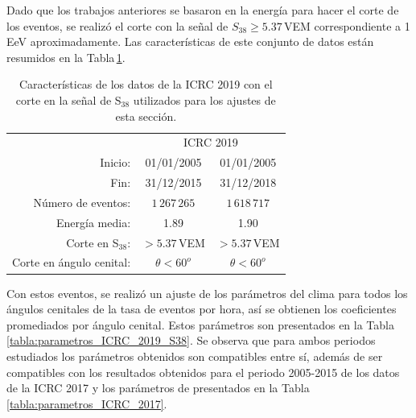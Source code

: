 Dado que los trabajos anteriores se basaron en la energía para hacer el corte de los eventos, se realizó el corte con la señal de $S_{38}\ge 5.37\,$VEM correspondiente a 1\,EeV aproximadamente. Las características de este conjunto de datos están resumidos en la Tabla\,\ref{tabla:caracteristicas_ICRC_2019_S38}.
   \begin{table}[H]
       \centering
       \begin{tabular}{r|c|c|}
    \cline{2-3}
                              & \multicolumn{2}{c|}{ICRC 2019} \\ \cline{2-3}
 
       Inicio:                 & 01/01/2005                 &  01/01/2005 \\
       Fin:                    & 31/12/2015                 &   31/12/2018 \\
       Número de eventos:       &   $1\,267\,265$     	    &  $1\,618\,717$     		\\ 
       Energía media:           &  1.89        		 	    &  1.90        		\\  
       Corte en S$_{38}$: 	   &  $>5.37$\,VEM   		 	    &  $>5.37$\,VEM       	\\  
       Corte en ángulo cenital: &  $\theta<60^o$ 			 	 & $\theta<60^o$\\ \cline{2-3}
       \end{tabular}
       \caption{Características de los datos de la ICRC 2019 con el corte en la señal de S$_{38}$ utilizados para los ajustes de esta sección.} \label{tabla:caracteristicas_ICRC_2019_S38}
   \end{table}
   
   Con estos eventos, se realizó un  ajuste de los parámetros del clima para todos los ángulos cenitales de la tasa de eventos por hora, así se obtienen los coeficientes promediados por ángulo cenital. Estos parámetros son presentados en la Tabla\,\ref{tabla:parametros_ICRC_2019_S38}. Se observa que para ambos periodos estudiados los parámetros obtenidos son compatibles entre sí, además de ser compatibles con los resultados obtenidos para el periodo 2005-2015 de los datos de la ICRC 2017 y los parámetros de \cite{aab2017impact} presentados en la Tabla\,\ref{tabla:parametros_ICRC_2017}.

